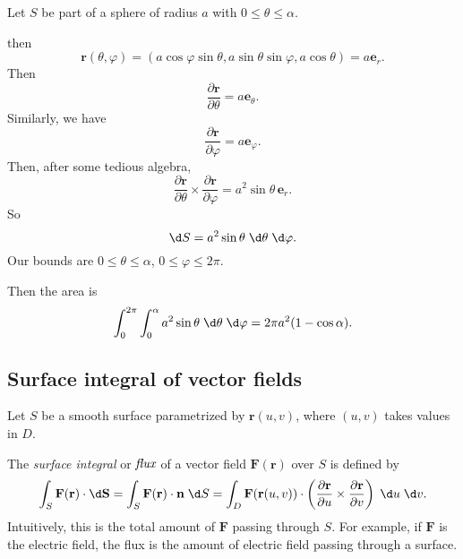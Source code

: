 \documentclass[a4paper]{article}
\begin{document}
\begin{eg}
  Let $S$ be part of a sphere of radius $a$ with $0 \leq \theta \leq \alpha$.
  \begin{center}
  \end{center}
  then
  \[
    \mathbf{r}(\theta, \varphi) = (a\cos\varphi\sin \theta, a\sin \theta\sin \varphi, a\cos \theta) = a\mathbf{e}_r.
  \]
  Then
  \[
    \frac{\partial \mathbf{r}}{\partial \theta} = a\mathbf{e}_\theta.
  \]
  Similarly, we have
  \[
    \frac{\partial \mathbf{r}}{\partial \varphi} = a \mathbf{e}_\varphi.
  \]
  Then, after some tedious algebra,
  \[
    \frac{\partial \mathbf{r}}{\partial \theta}\times \frac{\partial \mathbf{r}}{\partial \varphi} = a^2\sin \theta\, \mathbf{e}_r.
  \]
  So
  \[
    \d S = a^2\sin \theta\;\d \theta\;\d \varphi.
  \]
  Our bounds are $0 \leq \theta \leq \alpha$, $0 \leq \varphi \leq 2\pi$.

  Then the area is
  \[
    \int_0^{2\pi}\int_0^{\alpha} a^2\sin \theta\;\d \theta \;\d \varphi = 2\pi a^2(1 - \cos\alpha).
  \]
\end{eg}
\subsection{Surface integral of vector fields}
Let $S$ be a smooth surface parametrized by $\mathbf{r}(u, v)$, where $(u, v)$ takes values in $D$.
\begin{defi}
  The \emph{surface integral} or $\emph{flux}$ of a vector field $\mathbf{F}(\mathbf{r})$ over $S$ is defined by
  \[
    \int_S \mathbf{F}(\mathbf{r})\cdot \d \mathbf{S} = \int_S \mathbf{F}(\mathbf{r})\cdot \mathbf{n}\;\d S = \int_D \mathbf{F}(\mathbf{r}(u, v))\cdot \left(\frac{\partial \mathbf{r}}{\partial u}\times \frac{\partial \mathbf{r}}{\partial v}\right)\;\d u\;\d v.
  \]
  Intuitively, this is the total amount of $\mathbf{F}$ passing through $S$. For example, if $\mathbf{F}$ is the electric field, the flux is the amount of electric field passing through a surface.
\end{defi}
\end{document}
